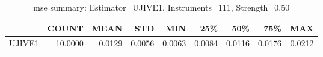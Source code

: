 \begin{table}[ht]
\centering
\caption{mse summary: Estimator=UJIVE1, Instruments=111, Strength=0.50}
\begin{tabular}{lrrrrrrrr}
\toprule
 & COUNT & MEAN & STD & MIN & 25\% & 50\% & 75\% & MAX \\
\midrule
UJIVE1 & 10.0000 & 0.0129 & 0.0056 & 0.0063 & 0.0084 & 0.0116 & 0.0176 & 0.0212 \\
\bottomrule
\end{tabular}
\end{table}
